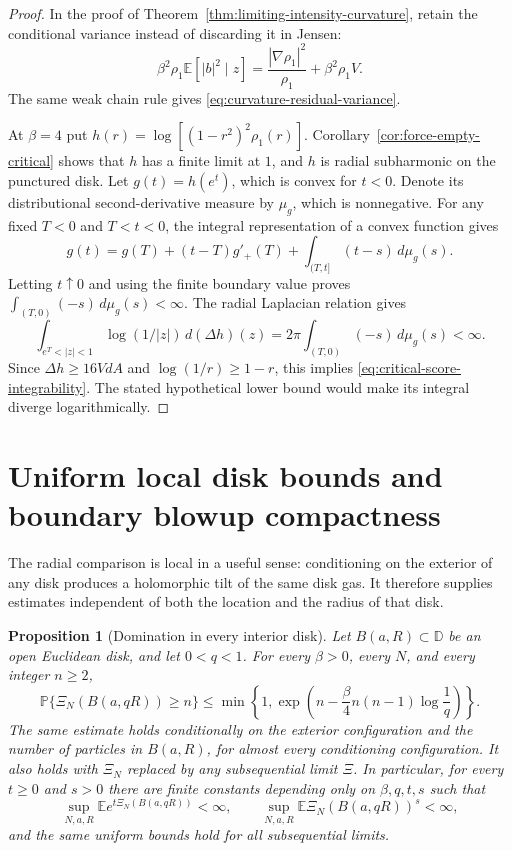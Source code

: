 \documentclass[11pt,a4paper]{article}
\numberwithin{equation}{section}
\newtheorem{proposition}[theorem]{Proposition}
\theoremstyle{definition}
\theoremstyle{remark}
\newcommand{\D}{\mathbb D}
\newcommand{\E}{\mathbb E}
\begin{document}
\begin{proof}
In the proof of Theorem~\ref{thm:limiting-intensity-curvature}, retain
the conditional variance instead of discarding it in Jensen:
\[
 \beta^2\rho_1\E[|b|^2\mid z]
 =\frac{|\nabla\rho_1|^2}{\rho_1}+\beta^2\rho_1 V.
\]
The same weak chain rule gives
\eqref{eq:curvature-residual-variance}.

At $\beta=4$ put $h(r)=\log[(1-r^2)^2\rho_1(r)]$.
Corollary~\ref{cor:force-empty-critical} shows that $h$ has a finite
limit at $1$, and $h$ is radial subharmonic on the punctured disk.
Let $g(t)=h(e^t)$, which is convex for $t<0$. Denote its distributional
second-derivative measure by $\mu_g$, which is nonnegative. For any fixed $T<0$ and
$T<t<0$, the integral representation of a convex function gives
\[
 g(t)=g(T)+(t-T)g'_+(T)
              +\int_{(T,t]}(t-s)\,d\mu_g(s).
\]
Letting $t\uparrow0$ and using the
finite boundary value proves
$\int_{(T,0)}(-s)\,d\mu_g(s)<\infty$.
The radial Laplacian relation gives
\[
 \int_{e^T<|z|<1}\log(1/|z|)\,d(\Delta h)(z)
 =2\pi\int_{(T,0)}(-s)\,d\mu_g(s)<\infty.
\]
Since $\Delta h\ge16VdA$ and
$\log(1/r)\ge1-r$, this implies
\eqref{eq:critical-score-integrability}. The stated hypothetical
lower bound would make its integral diverge logarithmically.
\end{proof}


\section{Uniform local disk bounds and boundary blowup compactness}
\label{sec:local-disk-domination}

The radial comparison is local in a useful sense: conditioning on the
exterior of any disk produces a holomorphic tilt of the same disk gas.
It therefore supplies estimates independent of both the location and
the radius of that disk.

\begin{proposition}[Domination in every interior disk]
\label{prop:local-disk-domination}
Let $B(a,R)\subset\D$ be an open Euclidean disk, and let $0<q<1$.
For every $\beta>0$, every $N$, and every integer $n\ge2$,
\begin{equation}\label{eq:local-disk-count-tail}
 \mathbb P\{\Xi_N(B(a,qR))\ge n\}
 \le \min\left\{1,
   \exp\left(n-\frac\beta4 n(n-1)\log\frac1q\right)\right\}.
\end{equation}
The same estimate holds conditionally on the exterior configuration
and the number of particles in $B(a,R)$, for almost every conditioning
configuration. It also holds with $\Xi_N$ replaced by any subsequential
limit $\Xi$. In particular, for every $t\ge0$ and $s>0$ there are finite
constants depending only on $\beta,q,t,s$ such that
\[
 \sup_{N,a,R}\E e^{t\Xi_N(B(a,qR))}<\infty,
 \qquad
 \sup_{N,a,R}\E\Xi_N(B(a,qR))^s<\infty,
\]
and the same uniform bounds hold for all subsequential limits.
\end{proposition}
\end{document}
